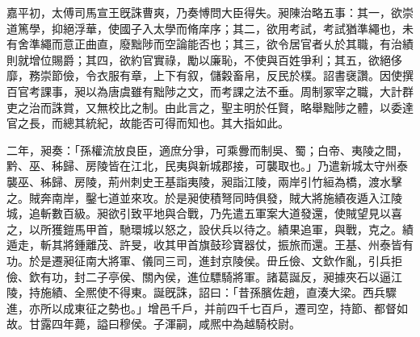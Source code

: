 \begin{pinyinscope}
 
 
 
 嘉平初，太傅司馬宣王旣誅曹爽，乃奏愽問大臣得失。昶陳治略五事：其一，欲崇道篤學，抑絕浮華，使國子入太學而脩庠序；其二，欲用考試，考試猶準繩也，未有舍準繩而意正曲直，廢黜陟而空論能否也；其三，欲令居官者乆於其職，有治績則就增位賜爵；其四，欲約官實祿，勵以廉恥，不使與百姓爭利；其五，欲絕侈靡，務崇節儉，令衣服有章，上下有叙，儲糓畜帛，反民於樸。詔書襃讚。因使撰百官考課事，昶以為唐虞雖有黜陟之文，而考課之法不垂。周制冢宰之職，大計群吏之治而誅賞，又無校比之制。由此言之，聖主明於任賢，略舉黜陟之體，以委達官之長，而總其統紀，故能否可得而知也。其大指如此。
 
 
二年，昶奏：「孫權流放良臣，適庶分爭，可乘釁而制吳、蜀；白帝、夷陵之間，黔、巫、秭歸、房陵皆在江北，民夷與新城郡接，可襲取也。」乃遣新城太守州泰襲巫、秭歸、房陵，荊州刺史王基詣夷陵，昶詣江陵，兩岸引竹絙為橋，渡水擊之。賊奔南岸，鑿七道並來攻。於是昶使積弩同時俱發，賊大將施績夜遁入江陵城，追斬數百級。昶欲引致平地與合戰，乃先遣五軍案大道發還，使賊望見以喜之，以所獲鎧馬甲首，馳環城以怒之，設伏兵以待之。績果追軍，與戰，克之。績遁走，斬其將鍾離茂、許旻，收其甲首旗鼓珍寶器仗，振旅而還。王基、州泰皆有功。於是遷昶征南大將軍、儀同三司，進封京陵侯。毌丘儉、文欽作亂，引兵拒儉、欽有功，封二子亭侯、關內侯，進位驃騎將軍。諸葛誕反，昶據夾石以逼江陵，持施績、全熈使不得東。誕旣誅，詔曰：「昔孫臏佐趙，直湊大梁。西兵驟進，亦所以成東征之勢也。」增邑千戶，并前四千七百戶，遷司空，持節、都督如故。甘露四年薨，謚曰穆侯。子渾嗣，咸熈中為越騎校尉。
 
 
\end{pinyinscope}